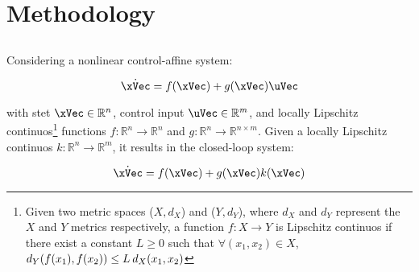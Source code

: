 
%


\chapter{Methodology}
\label{cha:methodology}

\glsresetall %




\section{}
\label{sec:clf_cbf}

Considering a nonlinear control-affine system:

\begin{equation}
    \dot{\xVec} = f(\xVec) + g(\xVec)\uVec
    \label{eq:Nonlinear-First-Order-System} 
\end{equation}

with stet \(\xVec \in \mathbb{R}^n\), control input \(\uVec \in \mathbb{R}^m\), and locally Lipschitz continuos\footnote{Given two metric spaces (\(X, d_X\)) and (\(Y, d_Y\)), where \(d_X\) and \(d_Y\)  represent the \(X\) and \(Y\) metrics respectively, a function \(f:X \to Y\) is Lipschitz continuos if there exist a constant \(L \geq 0\) such that \(\forall (x_1,x_2) \in X\), \hspace{0.4em} \(d_Y(f(x_1),f(x_2))\leq L \hspace{0.2em} d_X(x_1,x_2)\)} functions \(f: \mathbb{R}^n \to \mathbb{R}^n\) and \(g: \mathbb{R}^n \to \mathbb{R}^{n \times m}\). Given a locally Lipschitz continuos \(k: \mathbb{R}^n \to \mathbb{R}^m\), it results in the closed-loop system:

\begin{equation}
    \dot{\xVec} = f(\xVec) + g(\xVec)k(\xVec)
    \label{eq:Nonlinear-First-Order-Closed-Loop-System} 
\end{equation}

